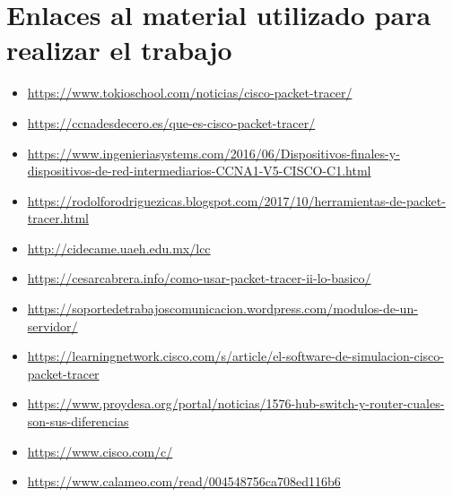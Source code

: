 \documentclass{article}
\begin{document}
\section{Enlaces al material utilizado para realizar el trabajo}
\begin{itemize}
    \item \href{https://www.tokioschool.com/noticias/cisco-packet-tracer/}{https://www.tokioschool.com/noticias/cisco-packet-tracer/}
    \item \href{https://ccnadesdecero.es/que-es-cisco-packet-tracer/}{https://ccnadesdecero.es/que-es-cisco-packet-tracer/}
    \item \href{https://www.ingenieriasystems.com/2016/06/Dispositivos-finales-y-dispositivos-de-red-intermediarios-CCNA1-V5-CISCO-C1.html}{https://www.ingenieriasystems.com/2016/06/Dispositivos-finales-y-dispositivos-de-red-intermediarios-CCNA1-V5-CISCO-C1.html}
    \item \href{https://rodolforodriguezicas.blogspot.com/2017/10/herramientas-de-packet-tracer.html}{https://rodolforodriguezicas.blogspot.com/2017/10/herramientas-de-packet-tracer.html}
    \item \href{http://cidecame.uaeh.edu.mx/lcc/mapa/PROYECTO/libro35/141_estructura_de_la_red.html#:~:text=Algunos%20ejemplos%20de%20dispositivos%20finales,Impresoras%20de%20red}{http://cidecame.uaeh.edu.mx/lcc}
    \item \href{https://cesarcabrera.info/como-usar-packet-tracer-ii-lo-basico/}{https://cesarcabrera.info/como-usar-packet-tracer-ii-lo-basico/}
    \item \href{https://soportedetrabajoscomunicacion.wordpress.com/modulos-de-un-servidor/}{https://soportedetrabajoscomunicacion.wordpress.com/modulos-de-un-servidor/}
    \item \href{https://learningnetwork.cisco.com/s/article/el-software-de-simulacion-cisco-packet-tracer}{https://learningnetwork.cisco.com/s/article/el-software-de-simulacion-cisco-packet-tracer}
    \item \href{https://www.proydesa.org/portal/noticias/1576-hub-switch-y-router-cuales-son-sus-diferencias}{https://www.proydesa.org/portal/noticias/1576-hub-switch-y-router-cuales-son-sus-diferencias}
    \item \href{https://www.cisco.com/c/dam/global/es_mx/assets/ofertas/desconectadosanonimos/routing/pdfs/brochure_redes.pdf}{https://www.cisco.com/c/}
    \item \href{https://www.calameo.com/read/004548756ca708ed116b6}{https://www.calameo.com/read/004548756ca708ed116b6}

\end{itemize}
\end{document}
